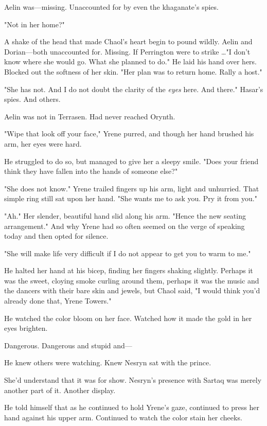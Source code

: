 Aelin was---missing.
Unaccounted for by even the khaganate's spies.

"Not in her home?"

A shake of the head that made Chaol's heart begin to pound wildly.
Aelin and Dorian---both unaccounted for.
Missing.
If Perrington were to strike \ldots"I don't know where she would go.
What she planned to do."
He laid his hand over hers.
Blocked out the softness of her skin.
"Her plan was to return home.
Rally a host."

"She has not.
And I do not doubt the clarity of the \emph{eyes} here.
And there."
Hasar's spies.
And others.

Aelin was not in Terrasen.
Had never reached Orynth.

"Wipe that look off your face," Yrene purred, and though her hand brushed his arm, her eyes were hard.

He struggled to do so, but managed to give her a sleepy smile.
"Does your friend think they have fallen into the hands of someone else?"

"She does not know."
Yrene trailed fingers up his arm, light and unhurried.
That simple ring still sat upon her hand.
"She wants me to ask you.
Pry it from you."

"Ah."
Her slender, beautiful hand slid along his arm.
"Hence the new seating arrangement."
And why Yrene had so often seemed on the verge of speaking today and then opted for silence.

"She will make life very difficult if I do not appear to get you to warm to me."

He halted her hand at his bicep, finding her fingers shaking slightly.
Perhaps it was the sweet, cloying smoke curling around them, perhaps it was the music and the dancers with their bare skin and jewels, but Chaol said, "I would think you'd already done that, Yrene Towers."

He watched the color bloom on her face.
Watched how it made the gold in her eyes brighten.

Dangerous.
Dangerous and stupid and---

He knew others were watching.
Knew Nesryn sat with the prince.

She'd understand that it was for show.
Nesryn's presence with Sartaq was merely another part of it.
Another display.

He told himself that as he continued to hold Yrene's gaze, continued to press her hand against his upper arm.
Continued to watch the color stain her cheeks.

